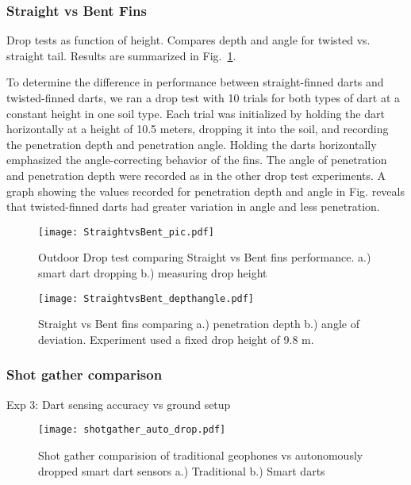 \subsubsection{Straight vs Bent Fins}

Drop tests as function of height. Compares depth and angle for twisted vs. straight tail.
Results are summarized in Fig.~\ref{fig:StraightBentPic}.

 To determine the difference in performance between straight-finned darts and twisted-finned darts, we ran a drop test with 10 trials for both types of dart at a constant height in one soil type. Each trial was initialized by holding the dart horizontally at a height of 10.5 meters, dropping it into the soil, and recording the penetration depth and penetration angle. Holding the darts horizontally emphasized the angle-correcting behavior of the fins. The angle of penetration and penetration depth were recorded as in the other drop test experiments. A graph showing the values recorded for penetration depth and angle in Fig. reveals that twisted-finned darts had greater variation in angle and less penetration.
\begin{figure} \centering
  {\texttt{[image: StraightvsBent\_pic.pdf]}}
 \caption{Outdoor Drop test comparing Straight vs Bent fins performance.
 a.)  smart dart dropping 
 b.)  measuring drop height} 
 \label{fig:StraightBentPic}
 \vspace{-1em}
\end{figure}
\begin{figure} \centering
  {\texttt{[image: StraightvsBent\_depthangle.pdf]}}
 \caption{\label{fig:StraightBentDepth}Straight vs Bent fins comparing a.) penetration depth b.) angle of deviation. Experiment used a fixed drop height of 9.8 m.} 
\end{figure}
\subsubsection{Shot gather comparison}
Exp 3: Dart sensing accuracy vs ground setup

\begin{figure} \centering
  {\texttt{[image: shotgather\_auto\_drop.pdf]}}
 \caption{Shot gather comparision of traditional geophones vs autonomously dropped smart dart sensors a.) Traditional b.) Smart darts} 
 \label{fig:TradvsAutoDrop}
\end{figure}


 